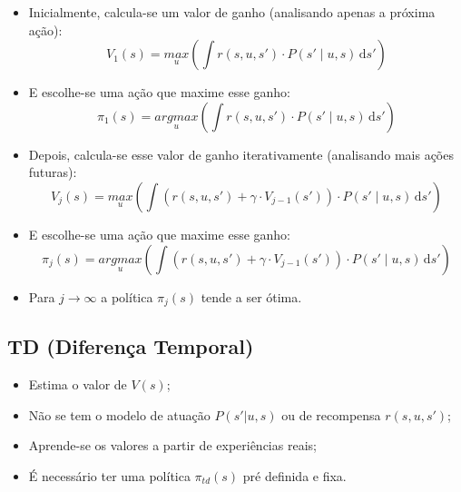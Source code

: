 \documentclass{beamer}
\begin{document}

\begin{frame}

\begin{itemize}
	\item Inicialmente, calcula-se um valor de ganho (analisando apenas a próxima ação): $$ V_1 \left( s \right) = \underset{u}{max} \left( \int \! r \left( s, u, s' \right) \cdot P \left( s' \mid u, s \right) \, \mathrm{d}s' \right) $$\pause
	\item E escolhe-se uma ação que maxime esse ganho: $$ \pi_1 \left( s \right) = \underset{u}{argmax} \left( \int \! r \left( s, u, s' \right) \cdot P \left( s' \mid u, s \right) \, \mathrm{d}s' \right) $$
\end{itemize}
\end{frame}


\begin{frame}

\begin{itemize}
	\item Depois, calcula-se esse valor de ganho iterativamente (analisando mais ações futuras): $$ V_j \left( s \right) = \underset{u}{max} \left( \int \! \left( r \left( s, u, s' \right) + \gamma \cdot V_{j-1} \left( s' \right) \right) \cdot P \left( s' \mid u, s \right) \, \mathrm{d}s' \right) $$\pause
	\item E escolhe-se uma ação que maxime esse ganho: $$ \pi_j \left( s \right) = \underset{u}{argmax} \left( \int \! \left( r \left( s, u, s' \right) + \gamma \cdot V_{j-1} \left( s' \right) \right) \cdot P \left( s' \mid u, s \right) \, \mathrm{d}s' \right) $$\pause
	\item Para $ j \rightarrow \infty $ a política $ \pi_j \left( s \right) $ tende a ser ótima.
\end{itemize}
\end{frame}



\subsection{TD (Diferença Temporal)}

\begin{frame}
\begin{itemize}
	\item Estima o valor de $ V \left( s \right) $;\pause
	\item Não se tem o modelo de atuação $ P \left(s' | u, s \right) $
	ou de recompensa $ r \left( s, u, s' \right) $;\pause
	\item Aprende-se os valores a partir de experiências reais;\pause
	\item É necessário ter uma política $ \pi_{td} \left( s \right) $ pré definida e fixa.
\end{itemize}
\end{frame}
\end{document}
